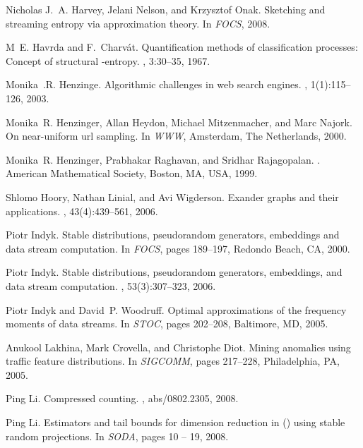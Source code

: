 \documentclass{sig-alternate}
\begin{document}
\begin{thebibliography}{10}
Nicholas J.~A. Harvey, Jelani Nelson, and Krzysztof Onak.
\newblock Sketching and streaming entropy via approximation theory.
\newblock In {\em FOCS}, 2008.

M~E. Havrda and F.~Charv\'at.
\newblock Quantification methods of classification processes: Concept of
  structural -entropy.
, 3:30--35, 1967.

Monika~.R. Henzinge.
\newblock Algorithmic challenges in web search engines.
, 1(1):115--126, 2003.

Monika~R. Henzinger, Allan Heydon, Michael Mitzenmacher, and Marc Najork.
\newblock On near-uniform url sampling.
\newblock In {\em WWW}, Amsterdam, The Netherlands, 2000.

Monika~R. Henzinger, Prabhakar Raghavan, and Sridhar Rajagopalan.
.
\newblock American Mathematical Society, Boston, MA, USA, 1999.

Shlomo Hoory, Nathan Linial, and Avi Wigderson.
\newblock Exander graphs and their applications.
, 43(4):439--561, 2006.

Piotr Indyk.
\newblock Stable distributions, pseudorandom generators, embeddings and data
  stream computation.
\newblock In {\em FOCS}, pages 189--197, Redondo Beach, CA, 2000.

Piotr Indyk.
\newblock Stable distributions, pseudorandom generators, embeddings, and data
  stream computation.
, 53(3):307--323, 2006.

Piotr Indyk and David~P. Woodruff.
\newblock Optimal approximations of the frequency moments of data streams.
\newblock In {\em STOC}, pages 202--208, Baltimore, MD, 2005.

Anukool Lakhina, Mark Crovella, and Christophe Diot.
\newblock Mining anomalies using traffic feature distributions.
\newblock In {\em SIGCOMM}, pages 217--228, Philadelphia, PA, 2005.

Ping Li.
\newblock Compressed counting.
, abs/0802.2305, 2008.

Ping Li.
\newblock Estimators and tail bounds for dimension reduction in 
  () using stable random projections.
\newblock In {\em SODA}, pages 10 -- 19, 2008.


\end{thebibliography}
\end{document}
